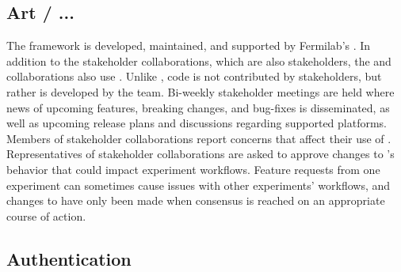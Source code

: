 \documentclass[../main-v1.tex]{subfiles}
\begin{document}
\subsection{Art / ...  }

The  framework is developed, maintained, and supported by Fermilab's .  In addition to the  stakeholder collaborations, which are also  stakeholders, the  and  collaborations also use .  Unlike , code is not contributed by stakeholders, but rather is developed by the  team.  Bi-weekly  stakeholder meetings are held where news of upcoming  features, breaking changes, and bug-fixes is disseminated, as well as upcoming release plans and discussions regarding supported platforms.  Members of stakeholder collaborations report concerns that affect their use of .  Representatives of stakeholder collaborations are asked to approve changes to 's behavior that could impact experiment workflows.  Feature requests from one experiment can sometimes cause issues with other experiments' workflows, and changes to  have only been made when consensus is reached on an appropriate course of action.

\subsection{Authentication }


\end{document}
